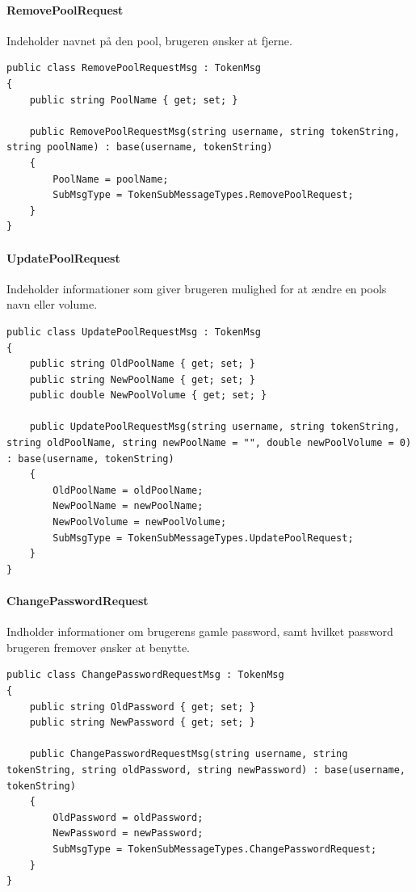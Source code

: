 \paragraph{RemovePoolRequest}
Indeholder navnet på den pool, brugeren ønsker at fjerne.
\begin{lstlisting}[caption=RemovePoolRequest, label=code:RemovePoolRequest]
public class RemovePoolRequestMsg : TokenMsg
{
	public string PoolName { get; set; }
	
	public RemovePoolRequestMsg(string username, string tokenString, string poolName) : base(username, tokenString)
	{
		PoolName = poolName;
		SubMsgType = TokenSubMessageTypes.RemovePoolRequest;
	}
}
\end{lstlisting}

\paragraph{UpdatePoolRequest}
Indeholder informationer som giver brugeren mulighed for at ændre en pools navn eller volume.
\begin{lstlisting}[caption=UpdatePoolRequest, label=code:UpdatePoolRequest]
public class UpdatePoolRequestMsg : TokenMsg
{
	public string OldPoolName { get; set; }
	public string NewPoolName { get; set; }
	public double NewPoolVolume { get; set; }
	
	public UpdatePoolRequestMsg(string username, string tokenString, string oldPoolName, string newPoolName = "", double newPoolVolume = 0) : base(username, tokenString)
	{
		OldPoolName = oldPoolName;
		NewPoolName = newPoolName;
		NewPoolVolume = newPoolVolume;
		SubMsgType = TokenSubMessageTypes.UpdatePoolRequest;
	}
}
\end{lstlisting}

\paragraph{ChangePasswordRequest}
Indholder informationer om brugerens gamle password, samt hvilket password brugeren fremover ønsker at benytte.
\begin{lstlisting}[caption=ChangePasswordRequest, label=code:ChangePasswordRequest]
public class ChangePasswordRequestMsg : TokenMsg
{
	public string OldPassword { get; set; }
	public string NewPassword { get; set; }
	
	public ChangePasswordRequestMsg(string username, string tokenString, string oldPassword, string newPassword) : base(username, tokenString)
	{
		OldPassword = oldPassword;
		NewPassword = newPassword;
		SubMsgType = TokenSubMessageTypes.ChangePasswordRequest;
	}
}
\end{lstlisting}


